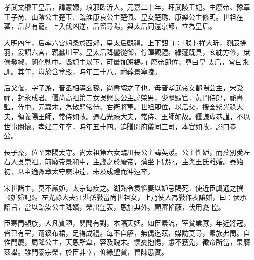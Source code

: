 \begin{pinyinscope}
 孝武文穆王皇后，諱憲嫄，琅邪臨沂人。元嘉二十年，拜武陵王妃。生廢帝、豫章王子尚、山陰公主楚玉、臨淮康哀公主楚佩、皇女楚琇、康樂公主修明。世祖在蕃，后甚有寵。上入伐凶逆，后留尋陽，與太后同還京都，立為皇后。



 大明四年，后率六宮躬桑於西郊，皇太后觀禮。上下詔曰：「朕卜祥大昕，測辰拂羽，爰詔六宮，親蠶川室。皇太后降鑾從御，佇蹕觀禮。綠蘧既具，玄紞方修，庶儀發椒，闈化動中。縣妃主以下，可量加班錫。」廢帝即位，尊曰皇
 太后，宮曰永訓。其年，崩於含章殿，時年三十八。祔葬景寧陵。



 后父偃，字子游，晉丞相導玄孫，尚書嘏之子也。母晉孝武帝女鄱陽公主，宋受禪，封永成君。偃尚高祖第二女吳興長公主諱榮男，少歷顯官，黃門侍郎，祕書監，侍中。元嘉末，為散騎常侍、右衛將軍。世祖即位，以后父，授金紫光祿大夫，領義陽王師，常侍如故。遷右光祿大夫，常侍、王師如故。偃謙虛恭謹，不以世事關懷。孝建二年卒，時年五十四。追贈開府儀同三司，本官如故，謚曰恭
 公。



 長子藻，位至東陽太守。尚太祖第六女臨川長公主諱英媛。公主性妒，而藻別愛左右人吳崇祖。前廢帝景和中，主讒之於廢帝，藻坐下獄死，主與王氏離婚。泰始初，以主適豫章太守庾沖遠，未及成禮而沖遠卒。



 宋世諸主，莫不嚴妒，太宗每疾之。湖熟令袁慆妻以妒忌賜死，使近臣虞通之撰《妒婦記》。左光祿大夫江湛孫斅當尚世祖女，上乃使人為斅作表讓婚，曰：伏承詔旨，當以臨汝公主降嬪，榮出望表，恩加典外。顧審輶蔽，伏用憂
 惶。



 臣寒門顇族，人凡質陋，閭閻有對，本隔天姻。如臣素流，室貧業寡，年近將冠，皆已有室，荊釵布裙，足得成禮。每不自解，無偶迄茲，媒訪莫尋，素族弗問。自惟門慶，屬降公主，天恩所覃，容及醜末。懷憂抱惕，慮不獲免，徵命所當，果膺茲舉。雖門泰宗榮，於臣非幸，仰緣聖貸，冒陳愚實。




\end{pinyinscope}
